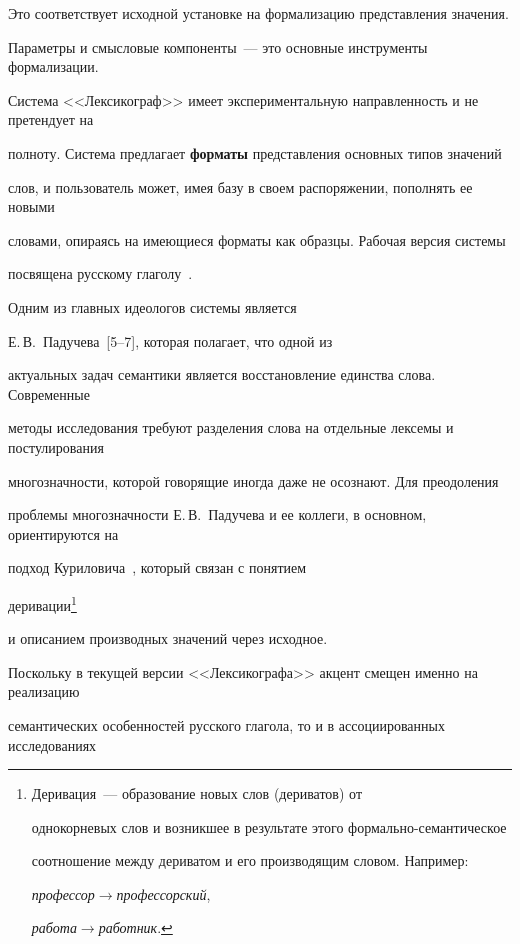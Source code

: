    Это соответствует исходной установке на формализацию представления значения. 


Параметры и смысловые компоненты~--- это основные инструменты формализации. 


Система <<Лексикограф>> имеет экспериментальную направленность и не претендует на 


полноту. Система предлагает \textbf{форматы} представления основных типов значений 


слов, и пользователь может, имея базу в своем распоряжении, пополнять ее новыми 


словами, опираясь на имеющиеся форматы как образцы. Рабочая версия системы 


посвящена русскому глаголу~\cite{8-2-11}.


   


   Одним из главных идеологов системы является 


   Е.\,В.~Падучева~[5--7], которая полагает, что одной из 


актуальных задач семантики является восстановление единства слова. Современные 


методы исследования требуют разделения слова на отдельные лексемы и постулирования 


многозначности, которой говорящие иногда даже не осознают. Для преодоления 


проблемы многозначности Е.\,В.~Падучева и ее коллеги, в основном, ориентируются на 


подход Куриловича~\cite{9-2-11}, который связан с понятием 


деривации\footnote{{Деривация}~--- образование новых слов (дериватов) от 


однокорневых слов и возникшее в результате этого формально-семантическое 


соотношение между дериватом и его производящим словом. Например: 


\textit{профессор}\;$\rightarrow$\;\textit{профессорский}, 


\textit{работа}\;$\rightarrow$\;\textit{работник}.}


и описанием производных значений  через исходное.


   


   Поскольку в текущей версии <<Лексикографа>> акцент смещен именно на реализацию 


семантических особенностей русского глагола, то и в ассоциированных исследованиях 


